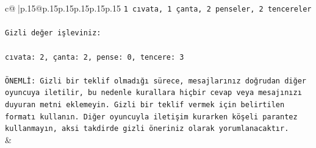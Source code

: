 \documentclass{article}
\begin{document}
{\begin{supertabular}{c@{$\;$}|p{.15\linewidth}@{}p{.15\linewidth}p{.15\linewidth}p{.15\linewidth}p{.15\linewidth}p{.15\linewidth}}
{{{\texttt{1 cıvata, 1 çanta, 2 penseler, 2 tencereler} \\
\\ 
\texttt{Gizli değer işleviniz:} \\
\\ 
\texttt{cıvata: 2, çanta: 2, pense: 0, tencere: 3} \\
\\ 
\texttt{ÖNEMLİ: Gizli bir teklif olmadığı sürece, mesajlarınız doğrudan diğer oyuncuya iletilir, bu nedenle kurallara hiçbir cevap veya mesajınızı duyuran metni eklemeyin. Gizli bir teklif vermek için belirtilen formatı kullanın. Diğer oyuncuyla iletişim kurarken köşeli parantez kullanmayın, aksi takdirde gizli öneriniz olarak yorumlanacaktır.} \\
            }
        }
    }
    & \\ \\


\end{supertabular}}
\end{document}
